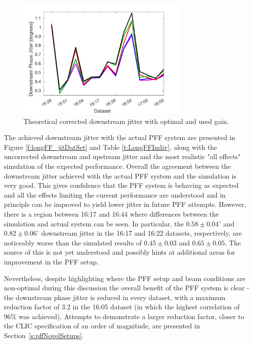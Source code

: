 \begin{figure}
  \centering
  \includegraphics[width=0.75\textwidth]{Figures/feedforward/longFF_datSetJitSim}
  \caption{Theoretical corrected downstream jitter with optimal and used gain.}
  \label{f:longFF_datSetJitSim}
\end{figure}

The achieved downstream jitter with the actual PFF system are presented in Figure 
\ref{f:longFF_jitDatSet} and Table \ref{t:LongFFIndiv}, along with the uncorrected 
downstream and upstream jitter and the most realistic "all effects" simulation of the 
expected performance. Overall the agreement between the downstream jitter achieved with 
the actual PFF system and the simulation is very good. This gives confidence that the 
PFF system is behaving as expected and all the effects limiting the current performance 
are understood and in principle can be improved to yield lower jitter in future PFF 
attempts. However, there is a region between 16:17 and 16:44 where differences between 
the simulation and actual system can be seen. In particular, the \(0.58\pm0.04^\circ\) 
and \(0.82\pm0.06^\circ\) downstream jitter in the 16:17 and 16:22 datasets, 
respectively, are noticeably worse than the simulated results of \(0.45\pm0.03\) and 
\(0.65\pm0.05\). The source of this is not yet understood and possibly hints at 
additional areas for improvement in the PFF setup. 


Nevertheless, despite highlighting where the PFF setup and beam conditions are 
non-optimal during this discussion the overall benefit of the PFF system is clear - the 
downstream phase jitter is reduced in every dataset, with a maximum reduction factor of 
3.2 in the 16:05 dataset (in which the highest correlation of 96\% was achieved). 
Attempts to demonstrate a larger reduction factor, closer to the CLIC specification of 
an order of magnitude, are presented in Section~\ref{s:pffNovelSetups}. 


